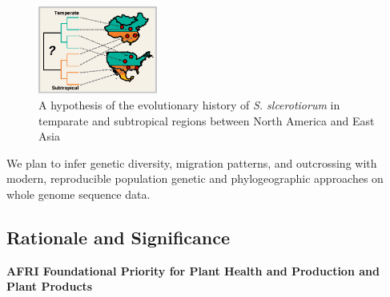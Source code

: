 \documentclass[12pt,letterpaper]{article}
\begin{document}
\begin{figure} %
  \includegraphics[width=0.35\textwidth]{figure/us-china.pdf}
  \caption{A hypothesis of the evolutionary history of \textit{S. slcerotiorum} in temparate and subtropical regions between North America and East Asia}
  \label{fig:us-china}
\end{figure}


We plan to infer genetic diversity, migration patterns, and outcrossing with modern, reproducible population genetic and phylogeographic approaches on whole genome sequence data. 





\subsection{Rationale and Significance}





\noindent
\textbf{AFRI Foundational Priority for Plant Health and Production and Plant Products}
\end{document}
